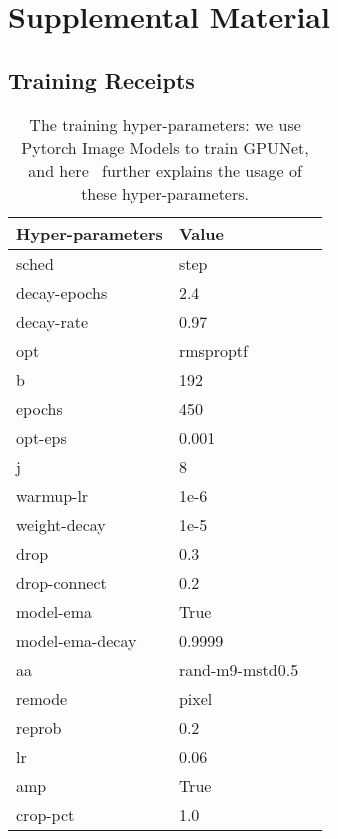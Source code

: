 \documentclass[10pt,twocolumn,letterpaper]{article}
\begin{document}
{\small


}

\newpage
\section{Supplemental Material}
\subsection{Training Receipts}
\label{training_receipts}

\begin{table}[!tb]
\footnotesize
\setlength{\tabcolsep}{0.2em}
  \centering
    \begin{tabular}{l l l }
          \toprule
          {Hyper-parameters} & {Value}   \\
          \midrule
          sched              & step      \\
          decay-epochs       & 2.4       \\
          decay-rate         & 0.97      \\
          opt                & rmsproptf \\
          b                  & 192       \\
          epochs             & 450       \\
          opt-eps            & 0.001     \\
          j                  & 8         \\
          warmup-lr          & 1e-6      \\
          weight-decay       & 1e-5      \\
          drop               & 0.3       \\
          drop-connect       & 0.2       \\
          model-ema          & True      \\
          model-ema-decay    & 0.9999    \\
          aa                 & rand-m9-mstd0.5 \\
          remode             & pixel     \\
          reprob             & 0.2       \\
          lr                 & 0.06      \\
          amp                & True      \\
          crop-pct           & 1.0       \\
          \bottomrule
    \end{tabular}
     \caption{The training hyper-parameters: we use Pytorch Image Models to train GPUNet, and here~\cite{pytorchimagemodels} further explains the usage of these hyper-parameters.}
     \label{table:training-hyperparameters}
\end{table}
\end{document}
